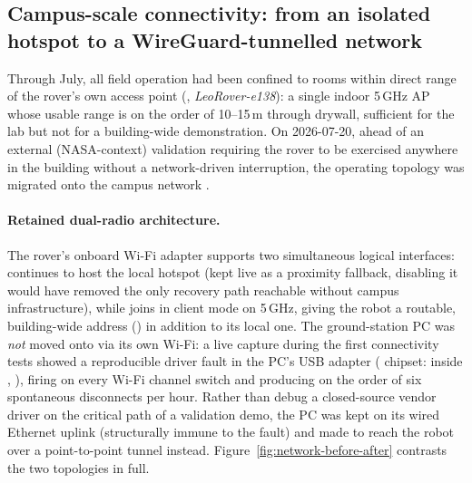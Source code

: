 \subsection{Campus-scale connectivity: from an isolated hotspot to a WireGuard-tunnelled network}
\label{sec:network}

Through July, all field operation had been confined to rooms within direct
range of the rover's own access point (, \emph{LeoRover-e138}):
a single indoor 5\,GHz AP whose usable range is on the order of
10--15\,m through drywall, sufficient for the lab but not for a
building-wide demonstration. On 2026-07-20, ahead of an external
(NASA-context) validation requiring the rover to be exercised anywhere in
the building without a network-driven interruption, the operating topology
was migrated onto the campus network .

\paragraph{Retained dual-radio architecture.} The rover's onboard Wi-Fi
adapter supports two simultaneous logical interfaces: 
continues to host the local hotspot (kept live as a proximity fallback,
disabling it would have removed the only recovery path reachable without
campus infrastructure), while  joins  in
client mode on 5\,GHz, giving the robot a routable, building-wide address
() in addition to its local one. The ground-station
PC was \emph{not} moved onto  via its own Wi-Fi: a live
 capture during the first connectivity tests showed a
reproducible driver fault in the PC's USB adapter ( chipset:
 inside ,
), firing on every Wi-Fi channel switch and producing
on the order of six spontaneous disconnects per hour. Rather than debug a
closed-source vendor driver on the critical path of a validation demo, the
PC was kept on its wired Ethernet uplink (structurally immune to the fault)
and made to reach the robot over a point-to-point tunnel instead.
Figure~\ref{fig:network-before-after} contrasts the two topologies in full.


